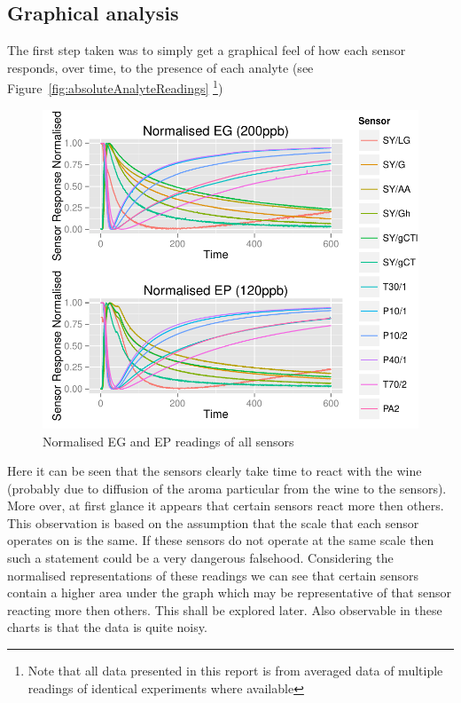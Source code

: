 \documentclass[twocolumn]{article}
\begin{document}
\subsection{Graphical analysis}
The first step taken was to simply get a graphical feel of 
how each sensor responds, over time, to the presence of each analyte (see Figure~\ref{fig:absoluteAnalyteReadings}
\footnote{Note that all data presented in this report is from averaged data of multiple readings of identical
experiments where available})

\begin{figure}[h!]
	\includegraphics[trim = 0mm 0mm 0mm 0mm, clip, scale=0.55]{normalisedEGEPreadings.pdf}
	\caption{Normalised EG and EP readings of all sensors}
	\label{fig:normalisedAnalyteReadings}
\end{figure}
Here it can be seen that the sensors clearly take time to react with the wine (probably due to
diffusion of the aroma particular from the wine to the sensors). More over, at first glance it appears that
certain sensors react more then others. This observation is based on the assumption that the scale that
each sensor operates on is the same. If these sensors do not operate at the same scale then such a statement
could be a very dangerous falsehood. Considering the normalised representations of these readings we can
see that certain sensors contain a higher area under the graph which may be representative of that sensor
reacting more then others. This shall be explored later. Also observable in these charts is that the data is quite noisy. 
\end{document}
